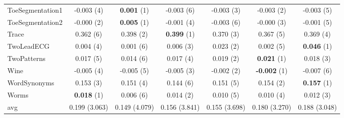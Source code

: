 \begin{table}[ht]
\begin{adjustbox}{width=\textwidth}
\begin{tabular}{lcccccc}
ToeSegmentation1 & -0.003 (4) & \textbf{0.001} (1) & -0.003 (6) & -0.003 (3) & -0.003 (2) & -0.003 (5) \\
ToeSegmentation2 & -0.000 (2) & \textbf{0.005} (1) & -0.001 (4) & -0.003 (6) & -0.000 (3) & -0.001 (5) \\
Trace & 0.362 (6) & 0.398 (2) & \textbf{0.399} (1) & 0.370 (3) & 0.367 (5) & 0.369 (4) \\
TwoLeadECG & 0.004 (4) & 0.001 (6) & 0.006 (3) & 0.023 (2) & 0.002 (5) & \textbf{0.046} (1) \\
TwoPatterns & 0.017 (5) & 0.014 (6) & 0.017 (4) & 0.019 (2) & \textbf{0.021} (1) & 0.018 (3) \\
Wine & -0.005 (4) & -0.005 (5) & -0.005 (3) & -0.002 (2) & \textbf{-0.002} (1) & -0.007 (6) \\
WordSynonyms & 0.153 (3) & 0.151 (4) & 0.144 (6) & 0.151 (5) & 0.154 (2) & \textbf{0.157} (1) \\
Worms & \textbf{0.018} (1) & 0.006 (6) & 0.014 (2) & 0.010 (5) & 0.010 (4) & 0.012 (3) \\
\hline 
avg & 0.199 (3.063) & 0.149 (4.079) & 0.156 (3.841) & 0.155 (3.698) & 0.180 (3.270) & 0.188 (3.048) \\ 
\hline
\end{tabular}
\end{adjustbox}
\end{table}


